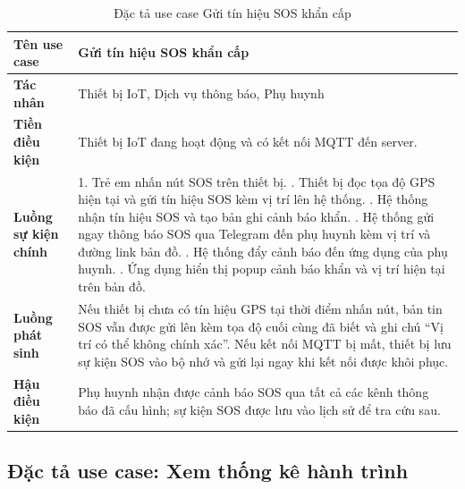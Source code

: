 \documentclass[../DoAn.tex]{subfiles}
\begin{document}
\begin{table}[H]
\centering
\caption{Đặc tả use case Gửi tín hiệu SOS khẩn cấp}
\label{table:uc_sos}
\begin{tabular}{|l|p{9.5cm}|}
\hline
\textbf{Tên use case}       & Gửi tín hiệu SOS khẩn cấp \\
\hline
\textbf{Tác nhân}           & Thiết bị IoT, Dịch vụ thông báo, Phụ huynh \\
\hline
\textbf{Tiền điều kiện}     & Thiết bị IoT đang hoạt động và có kết nối MQTT đến server. \\
\hline
\textbf{Luồng sự kiện chính} &
1. Trẻ em nhấn nút SOS trên thiết bị. \newline
2. Thiết bị đọc tọa độ GPS hiện tại và gửi tín hiệu SOS kèm vị trí lên hệ thống. \newline
3. Hệ thống nhận tín hiệu SOS và tạo bản ghi cảnh báo khẩn. \newline
4. Hệ thống gửi ngay thông báo SOS qua Telegram đến phụ huynh kèm vị trí và đường link bản đồ. \newline
5. Hệ thống đẩy cảnh báo đến ứng dụng của phụ huynh. \newline
6. Ứng dụng hiển thị popup cảnh báo khẩn và vị trí hiện tại trên bản đồ. \\
\hline
\textbf{Luồng phát sinh}    & Nếu thiết bị chưa có tín hiệu GPS tại thời điểm nhấn nút, bản tin SOS vẫn được gửi lên kèm tọa độ cuối cùng đã biết và ghi chú ``Vị trí có thể không chính xác''. Nếu kết nối MQTT bị mất, thiết bị lưu sự kiện SOS vào bộ nhớ và gửi lại ngay khi kết nối được khôi phục. \\
\hline
\textbf{Hậu điều kiện}      & Phụ huynh nhận được cảnh báo SOS qua tất cả các kênh thông báo đã cấu hình; sự kiện SOS được lưu vào lịch sử để tra cứu sau. \\
\hline
\end{tabular}
\end{table}

\subsection{Đặc tả use case: Xem thống kê hành trình}
\end{document}
